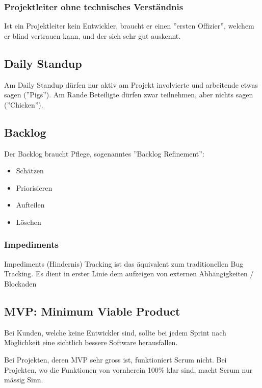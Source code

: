 \subsubsection{Projektleiter ohne technisches Verständnis}

Ist ein Projektleiter kein Entwickler, braucht er einen ''ersten Offizier'', welchem er blind vertrauen kann, und der sich sehr gut auskennt.

\subsection{Daily Standup}

Am Daily Standup dürfen nur aktiv am Projekt involvierte und arbeitende etwas sagen (''Pigs''). Am Rande Beteiligte dürfen zwar teilnehmen, aber nichts sagen (''Chicken'').

\subsection{Backlog}

Der Backlog braucht Pflege, sogenanntes ''Backlog Refinement'':

\begin{itemize}
	\item Schätzen
	\item Priorisieren
	\item Aufteilen
	\item Löschen
\end{itemize}

\subsubsection{Impediments}

Impediments (Hindernis) Tracking ist das äquivalent zum traditionellen Bug Tracking. Es dient in erster Linie dem aufzeigen von externen Abhängigkeiten / Blockaden

\subsection{MVP: Minimum Viable Product}

Bei Kunden, welche keine Entwickler sind, sollte bei jedem Sprint nach Möglichkeit eine sichtlich bessere Software herausfallen.

Bei Projekten, deren MVP sehr gross ist, funktioniert Scrum nicht. Bei Projekten, wo die Funktionen von vornherein 100\% klar sind, macht Scrum nur mässig Sinn.


